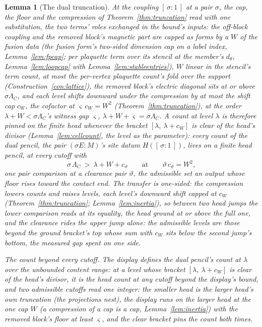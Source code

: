 \documentclass[11pt]{article}
\newtheorem{lemma}{Lemma}
\theoremstyle{definition}
\begin{document}
\begin{lemma}[The dual truncation]\label{lem:dualtrunc}
At the coupling $[\,\sigma:1\,]$ at a pair $\sigma$, the cap, the
floor and the compression of
Theorem~\ref{thm:truncation} read with one substitution, the
two terms' roles exchanged in the bound's inputs: the off-block coupling
and the removed block's magnetic part are capped as forms by a $W$ of the
fusion data (the fusion form's two-sided dimension cap on a label
index,
Lemma~\ref{lem:fpcap}; per plaquette term over its stencil at
the member's $d_\theta$,
Lemma~\ref{lem:loopcap} with Lemma~\ref{lem:stableentries}), $W$
linear in the stencil's term count, at most the per-vertex
plaquette count's fold over the support
(Construction~\ref{con:lattice}), the removed
block's electric diagonal sits at or above $\sigma\Lambda_C$, and each
level shifts downward under the compression by at most the
shift cap $c_W$, the cofactor at $\varsigma\,c_W=W^2$
(Theorem~\ref{thm:truncation}), at the order
$\lambda+W<\sigma\Lambda_C$'s witness gap $\varsigma$,
$\lambda+W+\varsigma=\sigma\Lambda_C$. A count at level $\lambda$ is
therefore pinned on the finite head whenever the bracket
$[\lambda,\ \lambda+c_W]$ is clear of the head's divisor
(Lemma~\ref{lem:cellcount}, the level as the parameter): every count of
the dual pencil, the pair $(\sigma E\!:\!M)$'s site datum
$H([\,\sigma:1\,])$, lives on a finite head
pencil, at every cutoff with
\[
\sigma\,\Lambda_C\ >\ \lambda+W+c_\vartheta
\qquad\text{at}\qquad \vartheta\,c_\vartheta=W^2 ,
\]
one pair comparison at a clearance pair $\vartheta$, the admissible set
an output whose floor rises toward the contact end. The transfer is one-sided: the compression lowers counts and raises
levels, each level's downward shift capped at $c_W$
(Theorem~\ref{thm:truncation}; Lemma~\ref{lem:inertia}), so between two
head jumps the lower comparison reads at its equality, the head ground at
or above the full one, and the clearance rides the upper jump alone: the
admissible levels are those beyond the ground bracket's top whose
sum with $c_W$ sits below the second
jump's bottom, the measured gap spent on one side.

\emph{The count beyond every cutoff.} The display defines the dual
pencil's count at $\lambda$ over the unbounded content range: at a
level whose bracket $[\lambda,\ \lambda+c_W]$ is clear of
the head's divisor, it is the head count at any cutoff beyond the
display's bound, and two admissible cutoffs read one integer: the
smaller head is the larger head's own truncation (the projections
nest), the display runs on the larger head at the one cap $W$ (a
compression of a cap is a cap, Lemma~\ref{lem:inertia}) with the
removed block's floor at least $\varsigma$, and the clear bracket
pins the count both times.


\end{lemma}
\end{document}
